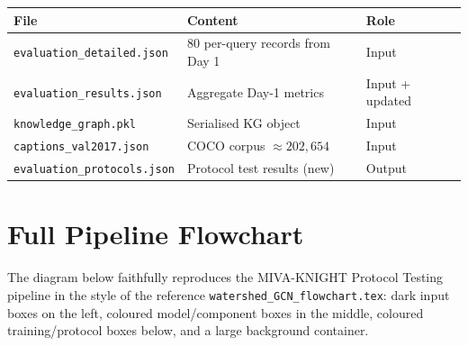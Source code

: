 \documentclass[12pt,a4paper]{article}
\theoremstyle{definition}
\theoremstyle{plain}
\theoremstyle{remark}
\begin{document}
\begin{center}
\renewcommand{\arraystretch}{1.3}
\begin{tabular}{lll}
\toprule
\textbf{File} & \textbf{Content} & \textbf{Role} \\
\midrule
\texttt{evaluation\_detailed.json}   & 80 per-query records from Day 1 & Input \\
\texttt{evaluation\_results.json}    & Aggregate Day-1 metrics          & Input + updated \\
\texttt{knowledge\_graph.pkl}        & Serialised KG object             & Input \\
\texttt{captions\_val2017.json}      & COCO corpus $\approx202{,}654$  & Input \\
\texttt{evaluation\_protocols.json}  & Protocol test results (new)      & Output \\
\bottomrule
\end{tabular}
\end{center}

\newpage
\section{Full Pipeline Flowchart}

The diagram below faithfully reproduces the MIVA-KNIGHT Protocol Testing
pipeline in the style of the reference \texttt{watershed\_GCN\_flowchart.tex}:
dark input boxes on the left, coloured model/component boxes in the middle,
coloured training/protocol boxes below, and a large background container.
\end{document}
